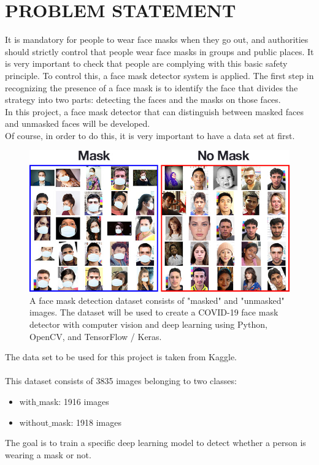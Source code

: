 \documentclass[a4paper, 12pt]{article}
\begin{document}
\section{PROBLEM  STATEMENT}

It is mandatory for people to wear face masks when they go out, and authorities should strictly control that people wear face masks in groups and public places. It is very important to check that people are complying with this basic safety principle. To control this, a face mask detector system is applied. The first step in recognizing the presence of a face mask is to identify the face that divides the strategy into two parts: detecting the faces and the masks on those faces. \\In this project, a face mask detector that can distinguish between masked faces and unmasked faces will be developed.
\\Of course, in order to do this, it is very important to have a data set at first.
\begin{figure}[h]
\includegraphics[scale=.43]{1.jpeg}
\centering
\caption{A face mask detection dataset consists of "masked" and "unmasked" images. The dataset will be used to create a COVID-19 face mask detector with computer vision and deep learning using Python, OpenCV, and TensorFlow / Keras.}
\end{figure}
\newpage
The data set to be used for this project is taken from Kaggle.\\ \\
This dataset consists of 3835 images belonging to two classes:
\begin{itemize}
\item with$\_$mask: 1916 images
\item without$\_$mask: 1918 images
\end{itemize}
The goal is to train a specific deep learning model to detect whether a person is wearing a mask or not.
\\
\end{document}
